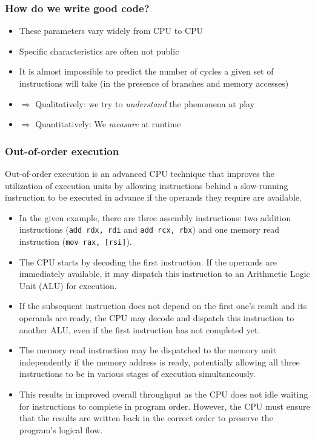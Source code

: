\documentclass[12pt]{article}
\begin{document}
\subsubsection{How do we write good code?}
\begin{itemize}
    \item These parameters vary widely from CPU to CPU
    \item Specific characteristics are often not public
    \item It is almost impossible to predict the number of cycles a given set of instructions will take (in the presence of branches and memory accesses)
    \item $\Rightarrow$ Qualitatively: we try to \textit{understand} the phenomena at play
    \item $\Rightarrow$ Quantitatively: We \textit{measure} at runtime
\end{itemize}

\subsubsection{Out-of-order execution}

Out-of-order execution is an advanced CPU technique that improves the utilization of execution units by allowing instructions behind a slow-running instruction to be executed in advance if the operands they require are available.

\begin{itemize}
    \item In the given example, there are three assembly instructions: two addition instructions (\texttt{add rdx, rdi} and \texttt{add rcx, rbx}) and one memory read instruction (\texttt{mov rax, [rsi]}).
    
    \item The CPU starts by decoding the first instruction. If the operands are immediately available, it may dispatch this instruction to an Arithmetic Logic Unit (ALU) for execution.
    
    \item If the subsequent instruction does not depend on the first one's result and its operands are ready, the CPU may decode and dispatch this instruction to another ALU, even if the first instruction has not completed yet.
    
    \item The memory read instruction may be dispatched to the memory unit independently if the memory address is ready, potentially allowing all three instructions to be in various stages of execution simultaneously.
    
    \item This results in improved overall throughput as the CPU does not idle waiting for instructions to complete in program order. However, the CPU must ensure that the results are written back in the correct order to preserve the program's logical flow.
\end{itemize}
\end{document}

